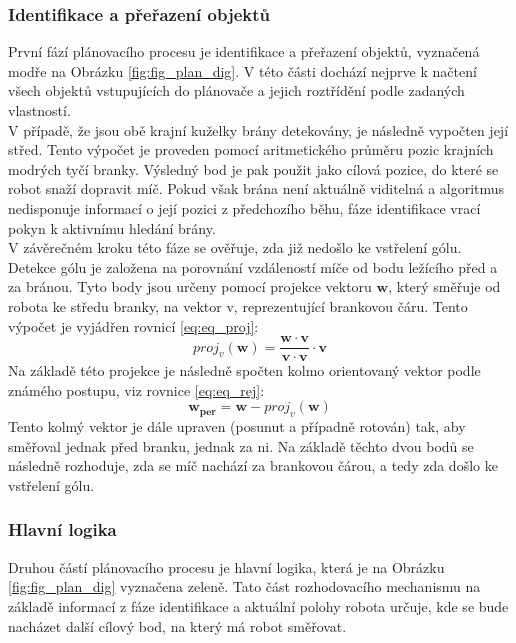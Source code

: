 \documentclass[a4paper,12pt]{article}
\begin{document}
\subsubsection{Identifikace a přeřazení objektů}
První fází plánovacího procesu je identifikace a přeřazení objektů, vyznačená modře na Obrázku \ref{fig:fig_plan_dig}. V této části dochází nejprve k načtení všech objektů vstupujících do plánovače a jejich roztřídění podle zadaných vlastností.\\
V případě, že jsou obě krajní kuželky brány detekovány, je následně vypočten její střed. Tento výpočet je proveden pomocí aritmetického průměru pozic krajních modrých tyčí branky. Výsledný bod je pak použit jako cílová pozice, do které se robot snaží dopravit míč. Pokud však brána není aktuálně viditelná a algoritmus nedisponuje informací o její pozici z předchozího běhu, fáze identifikace vrací pokyn k aktivnímu hledání brány.\\
V závěrečném kroku této fáze se ověřuje, zda již nedošlo ke vstřelení gólu. Detekce gólu je založena na porovnání vzdáleností míče od bodu ležícího před a za bránou. Tyto body jsou určeny pomocí projekce vektoru $\mathbf{w}$, který směřuje od robota ke středu branky, na vektor $\mathrm{v}$, reprezentující brankovou čáru. Tento výpočet je vyjádřen rovnicí \ref{eq:eq_proj}:
\begin{equation}
	proj_v(\mathbf{w})=\frac{\mathbf{w}\cdot\mathbf{v}}{\mathbf{v}\cdot\mathbf{v}}\cdot\mathbf{v}
	\label{eq:eq_proj}
\end{equation}
Na základě této projekce je následně spočten kolmo orientovaný vektor podle známého postupu, viz rovnice \ref{eq:eq_rej}:
\begin{equation}
	\mathbf{w_{per}}=\mathbf{w}-proj_v(\mathbf{w})
	\label{eq:eq_rej}
\end{equation}
Tento kolmý vektor je dále upraven (posunut a případně rotován) tak, aby směřoval jednak před branku, jednak za ni. Na základě těchto dvou bodů se následně rozhoduje, zda se míč nachází za brankovou čárou, a tedy zda došlo ke vstřelení gólu.\\

\subsubsection{Hlavní logika}
Druhou částí plánovacího procesu je hlavní logika, která je na Obrázku \ref{fig:fig_plan_dig} vyznačena zeleně. Tato část rozhodovacího mechanismu na základě informací z fáze identifikace a aktuální polohy robota určuje, kde se bude nacházet další cílový bod, na který má robot směřovat.\\
\end{document}
